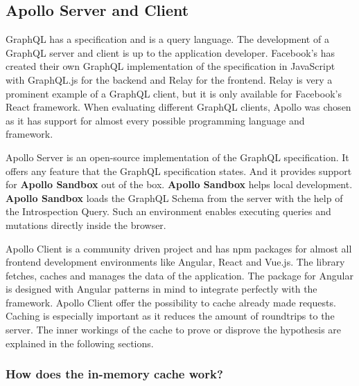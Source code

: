 \subsection{Apollo Server and Client}\label{subsection:background:graphql:apollo-server-client}

GraphQL has a specification and is a query language. The development of a GraphQL server and client is up to the application developer. Facebook's has created their own GraphQL implementation of the specification in JavaScript with GraphQL.js for the backend and Relay for the frontend. Relay is very a prominent example of a GraphQL client, but it is only available for Facebook's React framework. When evaluating different GraphQL clients, Apollo was chosen as it has support for almost every possible programming language and framework.

\bigskip

\noindent Apollo Server is an open-source implementation of the GraphQL specification. It offers any feature that the GraphQL specification states. And it provides support for \textbf{Apollo Sandbox} out of the box. \cite{misc:-:background:graphql:apollo-server-introduction} \textbf{Apollo Sandbox} helps local development. \textbf{Apollo Sandbox} loads the GraphQL Schema from the server with the help of the Introspection Query. \cite{misc:-:background:graphql:apollo-sandbox} Such an environment enables executing queries and mutations directly inside the browser.

\bigskip

\noindent Apollo Client is a community driven project and has npm packages for almost all frontend development environments like Angular, React and Vue.js. The library fetches, caches and manages the data of the application. The package for Angular is designed with Angular patterns in mind to integrate perfectly with the framework. Apollo Client offer the possibility to cache already made requests. \cite{misc:-:background:graphql:apollo-angular-client-overview} \cite{misc:-:background:graphql:apollo-client-overview} Caching is especially important as it reduces the amount of roundtrips to the server. The inner workings of the cache to prove or disprove the hypothesis are explained in the following sections.

\subsubsection{How does the in-memory cache work?}\label{subsubsection:background:graphql:apollo-server-client:in-memory-cache-working}

